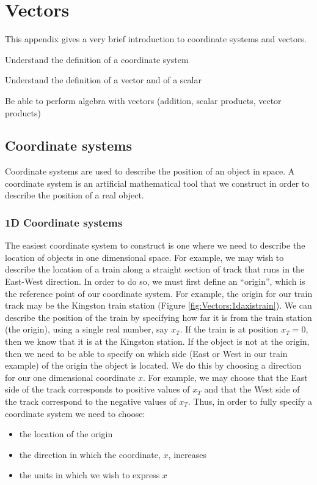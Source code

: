 \chapter{Vectors}
\label{app:vectors}
This appendix gives a very brief introduction to coordinate systems and vectors.
 \vspace{1cm}
\begin{learningObjectives}{
\item Understand the definition of a coordinate system
\item Understand the definition of a vector and of a scalar
\item Be able to perform algebra with vectors (addition, scalar products, vector products)}
\end{learningObjectives}

\section{Coordinate systems}
Coordinate systems are used to describe the position of an object in space. A coordinate system is an artificial mathematical tool that we construct in order to describe the position of a real object. 

\subsection{1D Coordinate systems} 
The easiest coordinate system to construct is one where we need to describe the location of objects in one dimensional space. For example, we may wish to describe the location of a train along a straight section of track that runs in the East-West direction. In order to do so, we must first define an ``origin'', which is the reference point of our coordinate system. For example, the origin for our train track may be the Kingston train station (Figure \ref{fig:Vectors:1daxistrain}). We can describe the position of the train by specifying how far it is from the train station (the origin), using a single real number, say $x_T$. If the train is at position $x_T=0$, then we know that it is at the Kingston station. If the object is not at the origin, then we need to be able to specify on which side (East or West in our train example) of the origin the object is located. We do this by choosing a direction for our one dimensional coordinate $x$. For example, we may choose that the East side of the track corresponds to positive values of $x_T$ and that the West side of the track correspond to the negative values of $x_T$. Thus, in order to fully specify a coordinate system we need to choose:
\begin{itemize}
\item the location of the origin
\item the direction in which the coordinate, $x$, increases
\item the units in which we wish to express $x$
\end{itemize} 

